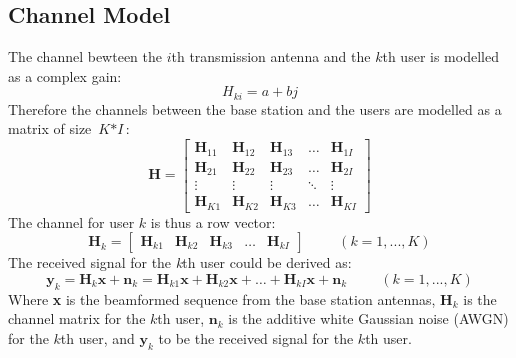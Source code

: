 \documentclass{article}
\begin{document}
\subsection{Channel Model}
The channel bewteen the $\textit{i}$th transmission antenna and the $\textit{k}$th user is modelled as a complex gain:
\[H_{ki} = a+bj\]
Therefore the channels between the base station and the users are modelled as a matrix of size $\textit{K}*\textit{I}$:
\[
\textbf{H}
=
\begin{bmatrix}
    \textbf{H}_{11} & \textbf{H}_{12} & \textbf{H}_{13} & \dots  & \textbf{H}_{1I} \\
    \textbf{H}_{21} & \textbf{H}_{22} & \textbf{H}_{23} & \dots  & \textbf{H}_{2I} \\
    \vdots & \vdots & \vdots & \ddots & \vdots \\
    \textbf{H}_{K1} & \textbf{H}_{K2} & \textbf{H}_{K3} & \dots  & \textbf{H}_{KI}
\end{bmatrix}
\]
The channel for user $\textit{k}$ is thus a row vector:
\[
\textbf{H}_k
=
\begin{bmatrix}
    \textbf{H}_{k1} & \textbf{H}_{k2} & \textbf{H}_{k3} & \dots  & \textbf{H}_{kI}
\end{bmatrix} \hspace{1cm}(k = 1,...,K)
\]
The received signal for the \textit{k}th user could be derived as:
\[
\textbf{y}_k = \textbf{H}_k\textbf{x}+\textbf{n}_k = \textbf{H}_{k1}\textbf{x} + \textbf{H}_{k2}\textbf{x} +
\dots + \textbf{H}_{kI}\textbf{x} + \textbf{n}_k \hspace{1cm}(k = 1,...,K)
\]
Where \textbf{x} is the beamformed sequence from the base station antennas, $\textbf{H}_k$ is the channel matrix for the $\textit{k}$th user,
$\textbf{n}_k$ is the additive white Gaussian noise (AWGN) for the $\textit{k}$th user, and $\textbf{y}_k$ to be the received signal for the $\textit{k}$th user.
\end{document}
